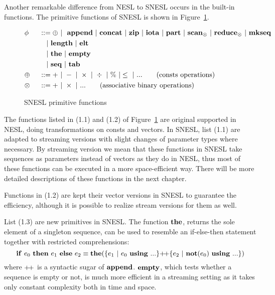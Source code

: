 Another remarkable difference from NESL to SNESL occurs in the built-in functions.
The primitive functions of SNESL is shown in Figure~\ref{fig-snesl-func}.

\begin{figure}[h]
\begin{alignat}{2} 
&\phi && ::= \oplus \ | \ \ \mathbf{append} \ | \ \mathbf{concat} \ | \ \mathbf{zip} \ | \ \mathbf{iota}  \ | \ \mathbf{part}  \ | \ \mathbf{scan}_{\otimes} \ | \ \mathbf{reduce}_{\otimes} \ | \ \mathbf{mkseq} \\
&   && \quad | \ \mathbf{length} \ | \ \mathbf{elt} \\
&   && \quad | \ \mathbf{the}  \ | \ \mathbf{empty} \\
&   && \quad | \ \mathbf{seq} \ | \ \mathbf{tab} \\
& \oplus  \ && :: = + \ | \ - \ | \ \times \ |  \  \div \ | \ \% \ | \le \ | \ ... \tag{consts operations} \\
& \otimes \ && :: = + \ | \ \times  \ | \ ...  \tag{associative binary operations}
\end{alignat}
\caption{SNESL primitive functions \label{fig-snesl-func}}
\end{figure}

The functions listed in (1.1) and (1.2) of Figure~\ref{fig-snesl-func} are original supported in NESL, doing transformations on consts and vectors. 
In SNESL, list (1.1) are adapted to streaming versions with slight changes of parameter types where necessary.
By streaming version we mean that these functions in SNESL take sequences as parameters instead of vectors as they do in NESL, thus most of these functions can be executed in a more space-efficient way.  
There will be more detailed descriptions of these functions in the next chapter.

Functions in (1.2) are kept their vector versions in SNESL to guarantee the efficiency, although it is possible to realize stream versions for them as well.

List (1.3) are new primitives in SNESL.  
The function $\mathbf{the}$, returns the sole element of a singleton sequence, can be used to resemble an if-else-then statement together with restricted comprehensions:
$$\*{if} \ e_0 \ \*{then} \ e_1 \ \*{else} \ e_2 \equiv \*{the}(\RComp{e_1}{e_0}{...} {\++} \RComp{e_2}{\*{not}(e_0)}{...}) $$
where ${\++}$ is a syntactic sugar of $\mathbf{append}$. 
$\mathbf{empty}$, which tests whether a sequence is empty or not, is much more efficient in a streaming setting as it takes only constant complexity both in time and space.
  
